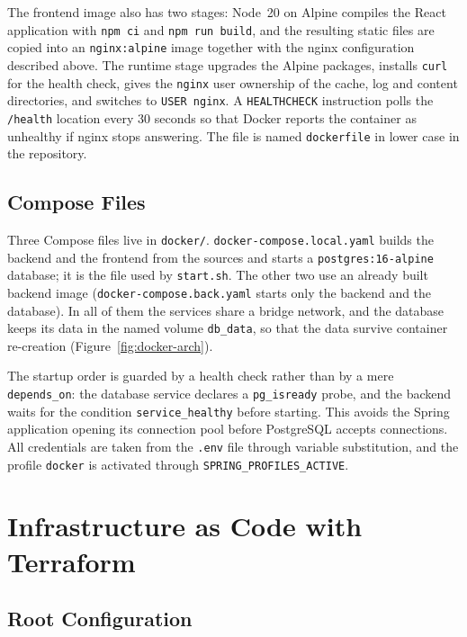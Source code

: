 The frontend image also has two stages: Node~20 on Alpine compiles the React application with \texttt{npm ci} and \texttt{npm run build}, and the resulting static files are copied into an \texttt{nginx:alpine} image together with the nginx configuration described above. The runtime stage upgrades the Alpine packages, installs \texttt{curl} for the health check, gives the \texttt{nginx} user ownership of the cache, log and content directories, and switches to \texttt{USER nginx}. A \texttt{HEALTHCHECK} instruction polls the \texttt{/health} location every 30 seconds so that Docker reports the container as unhealthy if nginx stops answering. The file is named \texttt{dockerfile} in lower case in the repository.


\subsection{Compose Files}

Three Compose files live in \texttt{docker/}. \texttt{docker-compose.local.yaml} builds the backend and the frontend from the sources and starts a \texttt{postgres:16-alpine} database; it is the file used by \texttt{start.sh}. The other two use an already built backend image (\texttt{docker-compose.back.yaml} starts only the backend and the database). In all of them the services share a bridge network, and the database keeps its data in the named volume \texttt{db\_data}, so that the data survive container re-creation (Figure~\ref{fig:docker-arch}).



The startup order is guarded by a health check rather than by a mere \texttt{depends\_on}: the database service declares a \texttt{pg\_isready} probe, and the backend waits for the condition \texttt{service\_healthy} before starting. This avoids the Spring application opening its connection pool before PostgreSQL accepts connections. All credentials are taken from the \texttt{.env} file through variable substitution, and the profile \texttt{docker} is activated through \texttt{SPRING\_PROFILES\_ACTIVE}.


\section{Infrastructure as Code with Terraform}
\label{sec:impl-terraform}

\subsection{Root Configuration}

